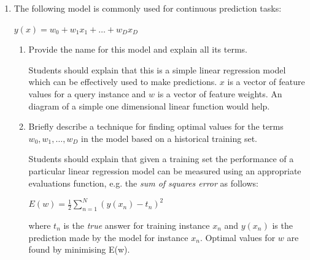 \documentclass[--SOLUTION-OPTION--]{ditpaper}
\begin{document}
\question 
	\begin{enumerate}
		\item The following model is commonly used for continuous prediction tasks:

\begin{center}
$y(x)=w_0 + w_1x_1 + \dots + w_Dx_D$
\end{center}

\begin{enumerate}
\item Provide the name for this model and explain all its terms.


		\begin{answer}
		Students should explain that this is a simple linear regression model which can be effectively used to make predictions. $x$ is a vector of feature values for a query instance and $w$ is a vector of feature weights. An diagram of a simple one dimensional linear function would help.
		\end{answer}
		
\item Briefly describe a technique for finding optimal values for the terms\\ $w_0, w_1, \dots , w_D$ in the model based on a historical training set.

		\begin{answer}
		
		Students should explain that given a training set the performance of a particular linear regression model can be measured using an appropriate evaluations function, e.g. the \emph{sum of squares error} as follows:
		
		\begin{center}
		$E(w)=\frac{1}{2}\sum_{n=1}^{N}(y(x_n)-t_n)^2$
		\end{center}
				
		where $t_n$ is the \emph{true} answer for training instance $x_n$ and $y(x_n)$ is the prediction made by the model for instance $x_n$. Optimal values for $w$ are found by minimising E(w).
		\end{answer}
\end{enumerate}
		

\end{enumerate}
\end{document}
